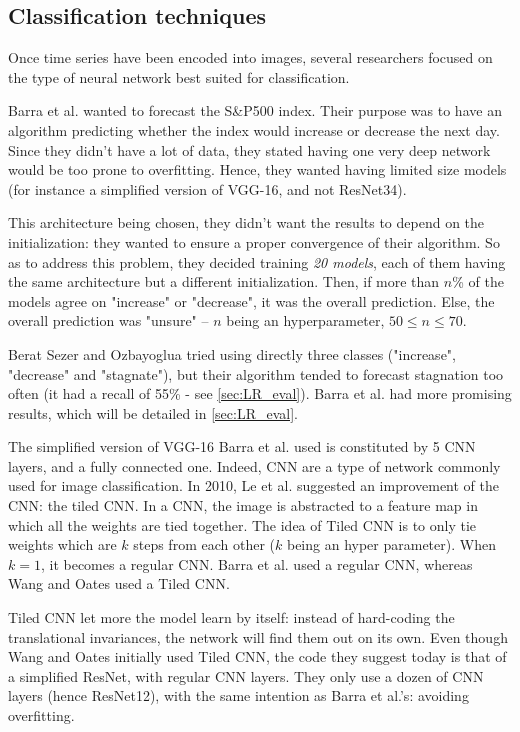 \documentclass[11pt]{article}
\begin{document}
\begin{onehalfspace}
\subsection{Classification techniques}
\label{sec:LR_classif}

Once time series have been encoded into images, several researchers focused on the type of neural network best suited for classification.

Barra et al. \cite{barra} wanted to forecast the S\&P500 index. Their purpose was to have an algorithm predicting whether the index would increase or decrease the next day. Since they didn't have a lot of data, they stated having one very deep network would be too prone to overfitting. Hence, they wanted having limited size models (for instance a simplified version of VGG-16, and not ResNet34). 

This architecture being chosen, they didn't want the results to depend on the initialization: they wanted to ensure a proper convergence of their algorithm. So as to address this problem, they decided training \emph{20 models}, each of them having the same architecture but a different initialization. Then, if more than $n$\% of the models agree on "increase" or "decrease", it was the overall prediction. Else, the overall prediction was "unsure" -- $n$ being an hyperparameter, $50 \leq n \leq 70$. 

Berat Sezer and Ozbayoglua \cite{berat} tried using directly three classes ("increase", "decrease" and "stagnate"), but their algorithm tended to forecast stagnation too often (it had a recall of 55\% - see \ref{sec:LR_eval}). Barra et al. \cite{barra} had more promising results, which will be detailed in \ref{sec:LR_eval}.

The simplified version of VGG-16 Barra et al. used is constituted by 5 CNN layers, and a fully connected one. Indeed, CNN are a type of network commonly used for image classification. In 2010, Le et al. \cite{le} suggested an improvement of the CNN: the tiled CNN. In a CNN, the image is abstracted to a feature map in which all the weights are tied together. The idea of Tiled CNN is to only tie weights which are $k$ steps from each other ($k$ being an hyper parameter). When $k = 1$, it becomes a regular CNN. Barra et al. used a regular CNN, whereas Wang and Oates \cite{wang} used a Tiled CNN.

Tiled CNN let more the model learn by itself: instead of hard-coding the translational invariances, the network will find them out on its own. Even though Wang and Oates initially used Tiled CNN, the code they suggest today is that of a simplified ResNet, with regular CNN layers. They only use a dozen of CNN layers (hence ResNet12), with the same intention as Barra et al.'s: avoiding overfitting. 


\end{onehalfspace}
\end{document}
